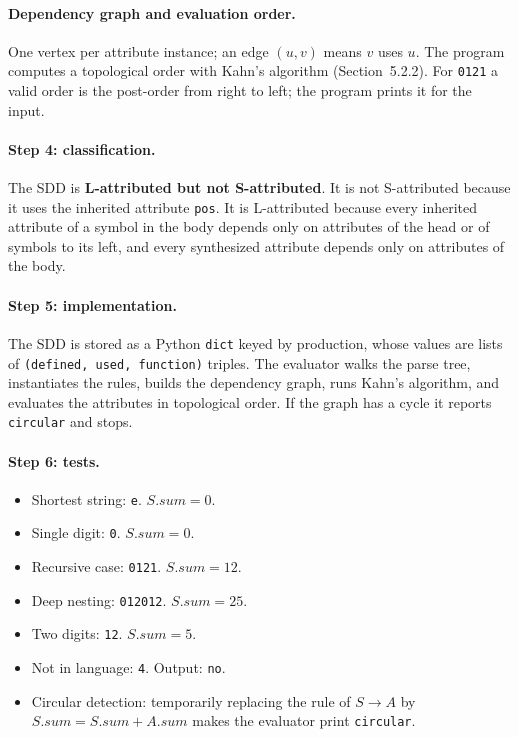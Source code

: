 \documentclass[11pt]{article}
\begin{document}
\paragraph{Dependency graph and evaluation order.} One vertex per attribute
instance; an edge $(u,v)$ means $v$ uses $u$. The program computes a topological
order with Kahn's algorithm (Section~5.2.2). For \texttt{0121} a valid order is
the post-order from right to left; the program prints it for the input.

\paragraph{Step 4: classification.} The SDD is \textbf{L-attributed but not
S-attributed}.
It is not S-attributed because it uses the inherited attribute \texttt{pos}.
It is L-attributed because every inherited attribute of a symbol in the body
depends only on attributes of the head or of symbols to its left, and every
synthesized attribute depends only on attributes of the body.

\paragraph{Step 5: implementation.} The SDD is stored as a Python
\texttt{dict} keyed by production, whose values are lists of
\texttt{(defined, used, function)} triples. The evaluator walks the parse tree,
instantiates the rules, builds the dependency graph, runs Kahn's algorithm, and
evaluates the attributes in topological order. If the graph has a cycle it
reports \texttt{circular} and stops.

\paragraph{Step 6: tests.}
\begin{itemize}
\item Shortest string: \texttt{e}. $S.sum=0$.
\item Single digit: \texttt{0}. $S.sum=0$.
\item Recursive case: \texttt{0121}. $S.sum=12$.
\item Deep nesting: \texttt{012012}. $S.sum=25$.
\item Two digits: \texttt{12}. $S.sum=5$.
\item Not in language: \texttt{4}. Output: \texttt{no}.
\item Circular detection: temporarily replacing the rule of $S\to A$ by
$S.sum = S.sum + A.sum$ makes the evaluator print \texttt{circular}.
\end{itemize}
\end{document}
